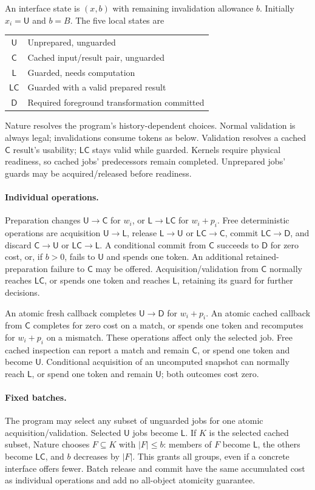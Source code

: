 \documentclass[acmsmall,screen,review,anonymous]{acmart}
\newcommand{\U}{\mathsf U}
\newcommand{\C}{\mathsf C}
\newcommand{\LL}{\mathsf L}
\newcommand{\LC}{\mathsf{LC}}
\newcommand{\D}{\mathsf D}
\begin{document}
An interface state is $(x,b)$ with remaining invalidation allowance $b$. Initially $x_i=\U$ and $b=B$. The five local states are
\begin{center}
\begin{tabular}{cl}
\toprule
$\U$ & Unprepared, unguarded\\
$\C$ & Cached input/result pair, unguarded\\
$\LL$ & Guarded, needs computation\\
$\LC$ & Guarded with a valid prepared result\\
$\D$ & Required foreground transformation committed\\
\bottomrule
\end{tabular}
\end{center}
Nature resolves the program's history-dependent choices. Normal validation is always legal; invalidations consume tokens as below. Validation resolves a cached $\C$ result's usability; $\LC$ stays valid while guarded. Kernels require physical readiness, so cached jobs' predecessors remain completed. Unprepared jobs' guards may be acquired/released before readiness.

\paragraph{Individual operations.}
Preparation changes $\U\to\C$ for $w_i$, or $\LL\to\LC$ for $w_i+p_i$. Free deterministic operations are acquisition $\U\to\LL$, release $\LL\to\U$ or $\LC\to\C$, commit $\LC\to\D$, and discard $\C\to\U$ or $\LC\to\LL$. A conditional commit from $\C$ succeeds to $\D$ for zero cost, or, if $b>0$, fails to $\U$ and spends one token. An additional retained-preparation failure to $\C$ may be offered. Acquisition/validation from $\C$ normally reaches $\LC$, or spends one token and reaches $\LL$, retaining its guard for further decisions.

An atomic fresh callback completes $\U\to\D$ for $w_i+p_i$. An atomic cached callback from $\C$ completes for zero cost on a match, or spends one token and recomputes for $w_i+p_i$ on a mismatch. These operations affect only the selected job. Free cached inspection can report a match and remain $\C$, or spend one token and become $\U$. Conditional acquisition of an uncomputed snapshot can normally reach $\LL$, or spend one token and remain $\U$; both outcomes cost zero.

\paragraph{Fixed batches.}
The program may select any subset of unguarded jobs for one atomic acquisition/validation. Selected $\U$ jobs become $\LL$. If $K$ is the selected cached subset, Nature chooses $F\subseteq K$ with $|F|\le b$: members of $F$ become $\LL$, the others become $\LC$, and $b$ decreases by $|F|$. This grants all groups, even if a concrete interface offers fewer. Batch release and commit have the same accumulated cost as individual operations and add no all-object atomicity guarantee.
\end{document}
